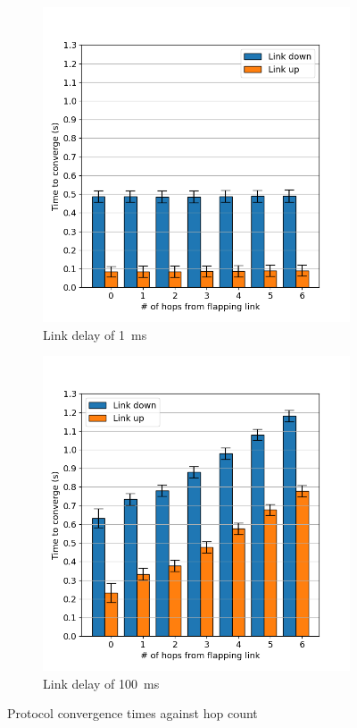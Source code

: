 \documentclass[withindex,glossary,openany]{cam-thesis}
\begin{document}
\begin{minipage}{1\textwidth}
\begin{figure}[H]
\centering
\begin{subfigure}{.5\textwidth}
  \centering
  \includegraphics[width=1\linewidth]{conv_1ms}
  \caption{Link delay of \SI{1}{\ms}}
  \label{fig:conv_1ms}
\end{subfigure}%
\begin{subfigure}{.5\textwidth}
  \centering
  \includegraphics[width=1\linewidth]{conv_100ms}
  \caption{Link delay of \SI{100}{\ms}}
  \label{fig:conv_100ms}
\end{subfigure}
\caption{Protocol convergence times against hop count}
\label{fig:conv}
\end{figure}

\end{minipage}
\end{document}
